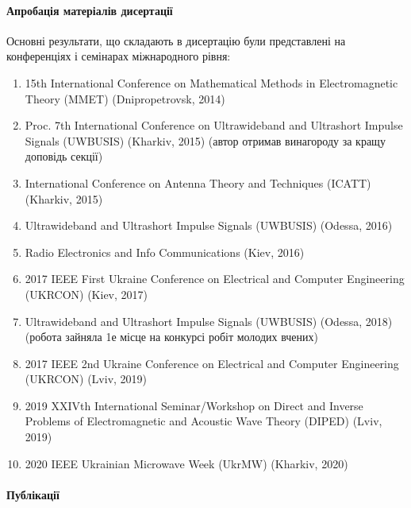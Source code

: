 \paragraph{Апробація матеріалів дисертації}

Основні результати, що складають в дисертацію були представлені 
на конференціях і семінарах міжнародного рівня:

\begin{enumerate}

	\item 15th International Conference on Mathematical Methods in 
	Electromagnetic Theory (MMET) (Dnipropetrovsk, 2014)

	\item Proc. 7th International Conference on Ultrawideband and 
	Ultrashort Impulse Signals (UWBUSIS) (Kharkiv, 2015) (автор отримав 
	винагороду за кращу доповідь секції)

	\item International Conference on Antenna Theory and Techniques
	(ICATT) (Kharkiv, 2015)

	\item Ultrawideband and Ultrashort Impulse Signals 
	(UWBUSIS) (Odessa, 2016)

	\item Radio Electronics and Info Communications (Kiev, 2016)

	\item 2017 IEEE First Ukraine Conference on Electrical and Computer 
	Engineering (UKRCON) (Kiev, 2017)

	\item Ultrawideband and Ultrashort Impulse Signals (UWBUSIS) 
	(Odessa, 2018) (робота зайняла 1е місце на конкурсі робіт молодих вчених)

	\item 2017 IEEE 2nd Ukraine Conference on Electrical and Computer 
	Engineering (UKRCON) (Lviv, 2019)

	\item 2019 XXIVth International Seminar/Workshop on Direct and Inverse
	Problems of Electromagnetic and Acoustic Wave Theory (DIPED) (Lviv, 2019)
	
	\item 2020 IEEE Ukrainian Microwave Week (UkrMW) (Kharkiv, 2020)
\end{enumerate} 

\paragraph{Публікації}

